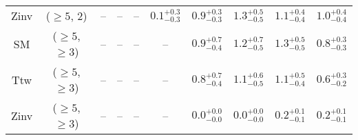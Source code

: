 \begin{table}[h!]
{\begin{tabular}{cccccccccc}
	Zinv & ($\ge5$, 2) & -- & -- & -- & $0.1^{+ 0.3 }_{- 0.3 }$ & $0.9^{+ 0.3 }_{- 0.3 }$ & $1.3^{+ 0.5 }_{- 0.5 }$ & $1.1^{+ 0.4 }_{- 0.4 }$ & $1.0^{+ 0.4 }_{- 0.4 }$ \\[0.5ex] 
	SM & ($\ge5$, $\ge3$) & -- & -- & -- & -- & $0.9^{+ 0.7 }_{- 0.4 }$ & $1.2^{+ 0.7 }_{- 0.5 }$ & $1.3^{+ 0.5 }_{- 0.5 }$ & $0.8^{+ 0.3 }_{- 0.3 }$ \\[0.5ex] 
	Ttw & ($\ge5$, $\ge3$) & -- & -- & -- & -- & $0.8^{+ 0.7 }_{- 0.4 }$ & $1.1^{+ 0.6 }_{- 0.5 }$ & $1.1^{+ 0.5 }_{- 0.4 }$ & $0.6^{+ 0.3 }_{- 0.2 }$ \\[0.5ex] 
	Zinv & ($\ge5$, $\ge3$) & -- & -- & -- & -- & $0.0^{+ 0.0 }_{- 0.0 }$ & $0.0^{+ 0.0 }_{- 0.0 }$ & $0.2^{+ 0.1 }_{- 0.1 }$ & $0.2^{+ 0.1 }_{- 0.1 }$ \\[0.5ex] 
	\hline
	\hline
\end{tabular}}
\end{table}
